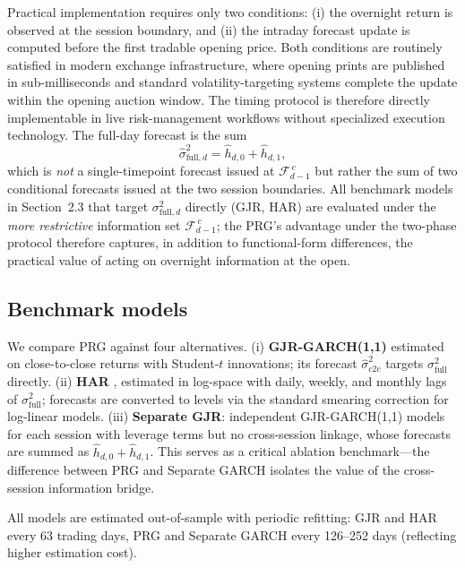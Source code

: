 \documentclass[11pt,a4paper]{article}
\begin{document}
Practical implementation requires only two conditions: (i) the overnight return is observed at the session boundary, and (ii) the intraday forecast update is computed before the first tradable opening price. Both conditions are routinely satisfied in modern exchange infrastructure, where opening prints are published in sub-milliseconds and standard volatility-targeting systems complete the update within the opening auction window. The timing protocol is therefore directly implementable in live risk-management workflows without specialized execution technology. The full-day forecast is the sum
\begin{equation}
    \hat{\sigma}^2_{\text{full},d} = \hat{h}_{d,0} + \hat{h}_{d,1},
    \label{eq:prg_fullday}
\end{equation}
which is \emph{not} a single-timepoint forecast issued at $\mathcal{F}_{d-1}^{\,c}$ but rather the sum of two conditional forecasts issued at the two session boundaries. All benchmark models in Section~2.3 that target $\sigma^2_{\text{full},d}$ directly (GJR, HAR) are evaluated under the \emph{more restrictive} information set $\mathcal{F}_{d-1}^{\,c}$; the PRG's advantage under the two-phase protocol therefore captures, in addition to functional-form differences, the practical value of acting on overnight information at the open.

\subsection{Benchmark models}

We compare PRG against four alternatives. (i) \textbf{GJR-GARCH(1,1)} \citep{Glosten1993} estimated on close-to-close returns with Student-$t$ innovations; its forecast $\hat{\sigma}^2_{c2c}$ targets $\sigma^2_{\text{full}}$ directly. (ii) \textbf{HAR} \citep{Corsi2009}, estimated in log-space with daily, weekly, and monthly lags of $\sigma^2_{\text{full}}$; forecasts are converted to levels via the standard smearing correction for log-linear models. (iii) \textbf{Separate GJR}: independent GJR-GARCH(1,1) models for each session with leverage terms but no cross-session linkage, whose forecasts are summed as $\hat{h}_{d,0} + \hat{h}_{d,1}$. This serves as a critical ablation benchmark---the difference between PRG and Separate GARCH isolates the value of the cross-session information bridge.

All models are estimated out-of-sample with periodic refitting: GJR and HAR every 63 trading days, PRG and Separate GARCH every 126--252 days (reflecting higher estimation cost).
\end{document}

